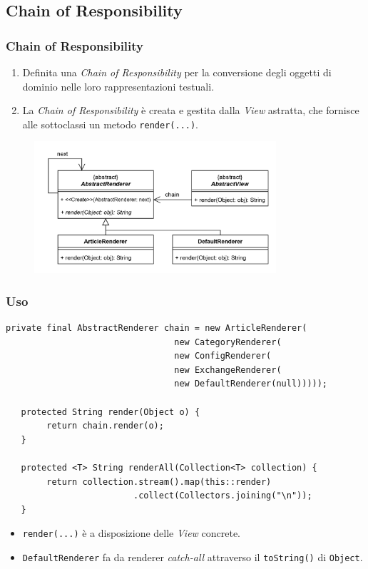 \subsection{Chain of Responsibility}
\begin{frame}
    \frametitle{Chain of Responsibility}
    \begin{enumerate}
        \item Definita una \emph{Chain of Responsibility} per la conversione degli oggetti
        di dominio nelle loro rappresentazioni testuali.
        \item La \emph{Chain of Responsibility} è creata e gestita dalla \emph{View} astratta,
        che fornisce alle sottoclassi un metodo \texttt{render(...)}.
    \end{enumerate}

    \begin{figure}
        \includegraphics[width=0.8\textwidth]{img/chain.png}
    \end{figure}
\end{frame}

\begin{frame}[fragile]
  \frametitle{Uso}
  \begin{lstlisting}[autogobble, title={\texttt{AbstractView.java}}]
   private final AbstractRenderer chain = new ArticleRenderer(
                                 new CategoryRenderer(
                                 new ConfigRenderer(
                                 new ExchangeRenderer(
                                 new DefaultRenderer(null)))));

   protected String render(Object o) {
        return chain.render(o);
   }

   protected <T> String renderAll(Collection<T> collection) {
        return collection.stream().map(this::render)
                         .collect(Collectors.joining("\n"));
   }
  \end{lstlisting}
    \begin{itemize}
        \item \texttt{render(...)} è a disposizione delle \emph{View} concrete.
        \item \texttt{DefaultRenderer} fa da renderer \emph{catch-all}
        attraverso il \texttt{toString()} di \texttt{Object}.
    \end{itemize}
\end{frame}

